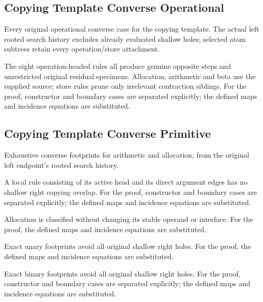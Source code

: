 \subsection{Copying Template Converse Operational}
Every original operational converse case for the copying template. The actual left rooted search history excludes already evaluated shallow holes; selected atom subtrees retain every operation/store attachment.

The eight operation-headed rules all produce genuine opposite steps and unrestricted original residual specimens. Allocation, arithmetic and beta use the supplied source; store rules prune only irrelevant contraction siblings.
For the proof, constructor and boundary cases are separated explicitly; the defined maps and incidence equations are substituted.
\par{}

\subsection{Copying Template Converse Primitive}
Exhaustive converse footprints for arithmetic and allocation, from the original left endpoint's rooted search history.

A local rule consisting of its active head and its direct argument edges has no shallow right copying overlap.
For the proof, constructor and boundary cases are separated explicitly; the defined maps and incidence equations are substituted.
\par{}

Allocation is classified without changing its stable operand or interface.
For the proof, the defined maps and incidence equations are substituted.
\par{}

Exact unary footprints avoid all original shallow right holes.
For the proof, the defined maps and incidence equations are substituted.
\par{}

Exact binary footprints avoid all original shallow right holes.
For the proof, constructor and boundary cases are separated explicitly; the defined maps and incidence equations are substituted.
\par{}

